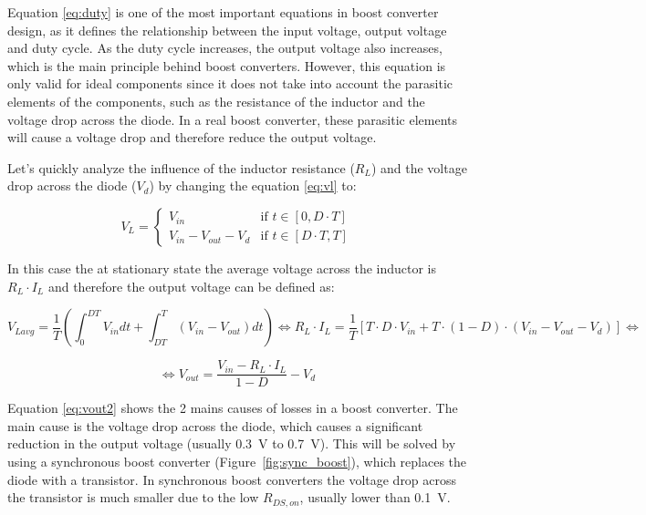 Equation \ref{eq:duty} is one of the most important equations in boost converter design, as it defines the relationship between the input voltage, output voltage and duty cycle. As the duty cycle increases, the output voltage also increases, which is the main principle behind boost converters. However, this equation is only valid for ideal components since it does not take into account the parasitic elements of the components, such as the resistance of the inductor and the voltage drop across the diode. In a real boost converter, these parasitic elements will cause a voltage drop and therefore reduce the output voltage.

Let's quickly analyze the influence of the inductor resistance ($R_L$) and the voltage drop across the diode ($V_d$) by changing the equation \ref{eq:vl} to:

\begin{equation}
    V_L = \begin{cases}
    V_{in} & \text{if } t \in [0, D \cdot T] \\
    V_{in} - V_{out} - V_d & \text{if } t \in [D \cdot T, T]
  \end{cases}
  \label{eq:vl2}
\end{equation}

In this case the at stationary state the average voltage across the inductor is $R_L \cdot I_L$ and therefore the output voltage can be defined as:

\begin{equation}
    V_{Lavg} = \frac{1}{T} (\int_{0}^{DT} V_{in} dt + \int_{DT}^{T} (V_{in} - V_{out}) dt) \Leftrightarrow R_L \cdot I_L = \frac{1}{T} [T \cdot D \cdot  V_{in} + T \cdot (1-D)\cdot(V_{in} - V_{out} -V_d)] \Leftrightarrow
\end{equation}

\begin{equation}
    \Leftrightarrow V_{out} = \frac{V_{in} - R_L \cdot I_L}{1-D}-V_d
    \label{eq:vout2}
\end{equation}

Equation \ref{eq:vout2} shows the 2 mains causes of losses in a boost converter. The main cause is the voltage drop across the diode, which causes a significant reduction in the output voltage (usually 0.3~V to 0.7~V). This will be solved by using a synchronous boost converter (Figure~\ref{fig:sync_boost}), which replaces the diode with a transistor. In synchronous boost converters the voltage drop across the transistor is much smaller due to the low $R_{DS,on}$, usually lower than 0.1~V.

